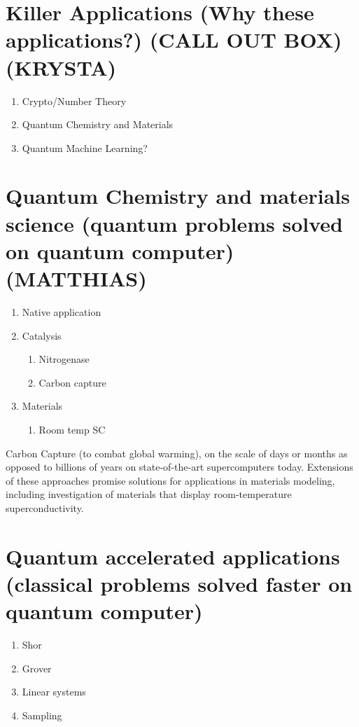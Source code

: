 \documentclass[journal]{IEEEtran}
\begin{document}
\section{Killer Applications (Why these applications?) (CALL OUT BOX) (KRYSTA)}
\begin{enumerate}
\item     Crypto/Number Theory
\item   Quantum Chemistry and Materials
\item    Quantum Machine Learning?
\end{enumerate}
\section{Quantum Chemistry and materials science (quantum problems solved on quantum computer) (MATTHIAS)}
\begin{enumerate}
\item      Native application
\item     Catalysis
\begin{enumerate}
                               \item         Nitrogenase
                           \item        Carbon capture
\end{enumerate}
\item      Materials
 \begin{enumerate}
                           \item         Room temp SC
\end{enumerate}
\end{enumerate}


 Carbon Capture (to combat global warming), on the scale of days or months as opposed to billions of years on state-of-the-art supercomputers today.  Extensions of these approaches promise solutions for applications in materials modeling, including investigation of materials that display room-temperature superconductivity. 




\section{Quantum accelerated applications (classical problems solved faster on quantum computer)}
\begin{enumerate}
\item    Shor
\item    Grover
\item     Linear systems
\item    Sampling
\end{enumerate}
\end{document}
